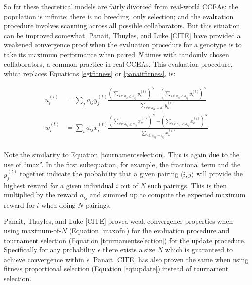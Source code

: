 \documentclass{acm_proc_article-sp}
\begin{document}
So far these theoretical models are fairly divorced from real-world CCEAs: the population is infinite; there is no breeding, only selection; and the evaluation procedure involves scanning across all possible collaborators.   But this situation can be improved somewhat.  Panait, Thuyles, and Luke [CITE] have provided a weakened convergence proof when the evaluation procedure for a genotype is to take its maximum performance when paired \(N\) times with randomly chosen collaborators, a common practice in real CCEAs.  This evaluation procedure, which replaces Equations \ref{egtfitness} or \ref{panaitfitness}, is:
 
\begin{equation}
\label{maxofn}
\begin{split}
u_i^{(t)} &= \sum_j a_{ij} y_j^{(t)} 
				  \frac{\left( \sum_{\forall k : a_{ik} \leq a_{ij}} y_k^{(t)} \right)^N -  
                                                \left( \sum_{\forall k : a_{ik} < a_{ij}} y_k^{(t)} \right)^N}  
                                                 {\sum_{\forall k : a_{ik} = a_{ij}} y_k^{(t)}} \\
w_i^{(t)} &= \sum_i a_{ij} x_i^{(t)} 
				  \frac{\left( \sum_{\forall k : a_{kj} \leq a_{ij}} x_k^{(t)} \right)^N -  
                                                \left( \sum_{\forall k : a_{kj} < a_{ij}} x_k^{(t)} \right)^N}  
                                                 {\sum_{\forall k : a_{kj} = a_{ij}} x_k^{(t)}} \\
\end{split}
\end{equation}

Note the similarity to Equation \ref{tournamentselection}.  This is again due to the use of ``max''.  In the first subequation, for example, the fractional term and the  \(y_j^{(t)}\) together indicate the probability that a given pairing \({\langle}i,j{\rangle}\) will provide the highest reward for a given individual \(i\) out of \(N\) such pairings.  This is then multiplied by the reward \(a_{ij}\) and summed up to compute the expected maximum reward for \(i\) when doing \(N\) pairings.

Panait, Thuyles, and Luke [CITE] proved weak convergence properties when using maximum-of-\(N\) (Equation \ref{maxofn}) for the evaluation procedure and tournament selection (Equation \ref{tournamentselection}) for the update procedure.  Specifically for any probability \(\epsilon\) there exists a size \(N\) which is guaranteed to achieve convergence within \(\epsilon\).  Panait [CITE] has also proven the same when using fitness proportional selection (Equation \ref{eqtupdate}) instead of tournament selection.
\end{document}
